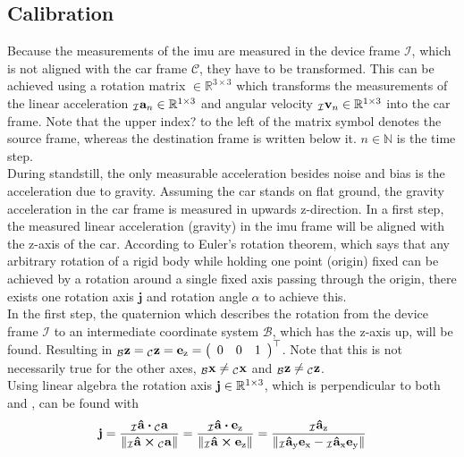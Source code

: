 \subsection{Calibration}
Because the measurements of the \acrshort{imu} are measured in the device frame $\mathcal{I}$, which is not aligned with the car frame $\mathcal{C}$, they have to be transformed.
This can be achieved using a rotation matrix  $\in \mathbb{R}^{3\times3}$ which transforms the measurements of the linear acceleration $\vincs{a}{I}_n \in \mathbb{R}^{1\times3}$ and angular velocity ${\vincs{v}{I}_n \in \mathbb{R}^{1\times3}}$ into the car frame.
Note that the upper index? to the left of the matrix symbol denotes the source frame, whereas the destination frame is written below it.
 $n \in \mathbb{N}$ is the time step.\\
During standstill, the only measurable acceleration besides noise and bias is the acceleration due to gravity.
Assuming the car stands on flat ground, the gravity acceleration in the car frame is measured in upwards z-direction.
In a first step, the measured linear acceleration (gravity) in the \acrshort{imu} frame will be aligned with the z-axis of the car.
According to Euler's rotation theorem, which says that any arbitrary rotation of a rigid body while holding one point (origin) fixed can be achieved by a rotation around a single fixed axis passing through the origin, there exists one rotation axis $\mathbf{j}$ and rotation angle $\alpha$ to achieve this.\\
In the first step, the quaternion  which describes the rotation from the device frame $\mathcal{I}$ to an intermediate coordinate system $\mathcal{B}$, which has the z-axis up, will be found.
Resulting in $\vincs{z}{b} = \vincs{z}{c} = \mathbf{e}_\mathrm{z} = \left(\begin{array}{lll} 0 & 0 & 1 \end{array}\right)^{\top}$.
Note that this is not necessarily true for the other axes, $\vincs{x}{b}\neq\vincs{x}{c}$ and $\vincs{z}{b}\neq\vincs{z}{c}$.\\
Using linear algebra  the rotation axis $\vb{j} \in \mathbb{R}^{1\times3}$, which is perpendicular to both  and , can be found with
\begin{equation}
    \vb{j} = \frac{\vincs{\vu{a}}{i} \vdot \vincs{a}{c}}{\norm{\vincs{\vu{a}}{i} \cp \vincs{a}{c}}}
    = \frac{\vincs{\vu{a}}{i} \vdot \vb{e}_\mathrm{z} }{\norm{\vincs{\vu{a}}{i} \cp \vb{e}_\mathrm{z}}}
    = \frac{\vincs{\vu{a}_\mathrm{z}}{i}}{\norm{\vincs{\vu{a}_\mathrm{y}}{i}\vb{e}_\mathrm{x} - \vincs{\vu{a}_\mathrm{x}}{i}\vb{e}_\mathrm{y}}}
\end{equation}
